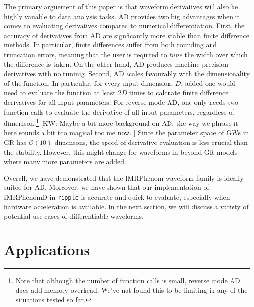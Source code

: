 \documentclass[twocolumn]{aastex631}
\newcommand{\ripple}{\texttt{ripple}\xspace}
\newcommand{\kw}[1]{{\color{rb4}[KW: #1 ]}}
\begin{document}
The primary arguement of this paper is that waveform derivatives will also be highly vauable to data analysis tasks. 
AD provides two big advantages when it comes to evaluating derivatives compared to numerical differentiation.
First, the accuracy of derivatives from AD are signficantly more stable than finite difference methods.
In particular, finite differences suffer from both rounding and truncation errors, meaning that the user is required to \textit{tune} the width over which the difference is taken.
On the other hand, AD produces machine precision derivatives with no tuninig.
Second, AD scales favourably with the dimensionality of the function.
In particular, for every input dimension, $D$, added one would need to evaluate the function at least $2D$ times to calcuate finite difference derivatives for all input parameters.
For reverse mode AD, one only needs two function calls to evaluate the derivative of all input parameters, regardless of dimenison.\footnote{
    Note that although the number of function calls is small, reverse mode AD does add memory overhead.
    We've not found this to be limiting in any of the situations tested so far.
}
\kw{Maybe a bit more background on AD, the way we phrase it here sounds a bit too magical too me now.}
Since the parameter space of GWs in GR has $\mathcal{O}(10)$ dimensons, the speed of derivative evaluation is less crucial than the stability.
However, this might change for waveforms in beyond GR models where many more parameters are added.

Overall, we have demonstrated that the IMRPhenom waveform family is ideally suited for AD.
Moreover, we have shown that our implementation of IMRPhenomD in \ripple is accurate and quick to evaluate, especially when hardware acceleration is available.
In the next section, we will discuss a variety of potential use cases of differentiable waveforms.


\section{Applications}
\label{sec:applications}
\end{document}
